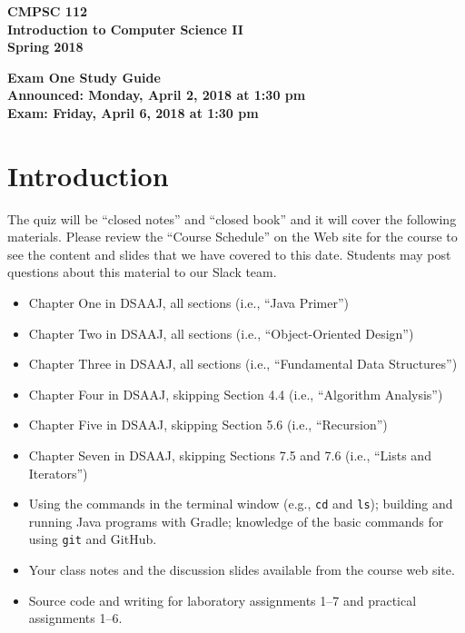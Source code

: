 \documentclass[11pt]{article}
\newcommand{\assignmentduedate}{April 6}
\newcommand{\assignmentassignedate}{April 2}
\newcommand{\assignmentnumber}{One}
\newcommand{\labyear}{2018}
\newcommand{\assignedday}{Monday}
\newcommand{\dueday}{Friday}
\newcommand{\labtime}{1:30 pm}
\newcommand{\assigneddate}{Announced: \assignedday, \assignmentassignedate, \labyear{} at \labtime{}}
\newcommand{\duedate}{Exam: \dueday, \assignmentduedate, \labyear{} at \labtime{}}
\newcommand{\program}[1]{\lstinline{#1}}
\newcommand{\guidetitle}[1]
{
  \begin{center}
    \begin{center}
      \bf
      CMPSC 112\\Introduction to Computer Science II\\
      Spring 2018\\
      \medskip
    \end{center}
    \bf
    #1
  \end{center}
}
\begin{document}
\thispagestyle{empty}

\guidetitle{Exam \assignmentnumber{} Study Guide \\ \assigneddate{} \\ \duedate{}}

\section*{Introduction}

\noindent
The quiz will be ``closed notes'' and ``closed book'' and it will cover the
following materials. Please review the ``Course Schedule'' on the Web site for
the course to see the content and slides that we have covered to this date.
Students may post questions about this material to our Slack team.

\begin{itemize}

  \itemsep 0in

  \item Chapter One in DSAAJ, all sections (i.e., ``Java Primer'')

  \item Chapter Two in DSAAJ, all sections (i.e., ``Object-Oriented Design'')

  \item Chapter Three in DSAAJ, all sections (i.e., ``Fundamental Data Structures'')

  \item Chapter Four in DSAAJ, skipping Section 4.4 (i.e., ``Algorithm Analysis'')

  \item Chapter Five in DSAAJ, skipping Section 5.6 (i.e., ``Recursion'')

  \item Chapter Seven in DSAAJ, skipping Sections 7.5 and 7.6 (i.e., ``Lists and Iterators'')

  \item Using the commands in the terminal window (e.g., \program{cd} and
    \program{ls}); building and running Java programs with Gradle; knowledge of
    the basic commands for using \program{git} and GitHub.

  \item Your class notes and the discussion slides available from the course web
    site.

  \item Source code and writing for laboratory assignments 1--7 and practical
    assignments 1--6.

\end{itemize}
\end{document}
